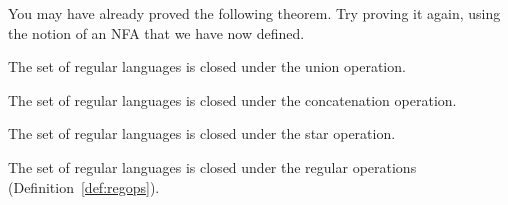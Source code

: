 \documentclass[twoside,letterpaper,openany]{book}
\begin{document}
\begin{discussion}
You may have already proved the following theorem. Try proving it again, using the notion of an NFA that we have now defined. 
\end{discussion}

\begin{thm}
The set of regular languages is closed under the union operation.
\end{thm}

\begin{thm}
The set of regular languages is closed under the concatenation operation.
\end{thm}

\begin{thm}
The set of regular languages is closed under the star operation.
\end{thm}

\begin{corol}
The set of regular languages is closed under the regular operations (Definition~\ref{def:regops}).
\end{corol}

\newcommand\charA{{\texttt{a}}}
\newcommand\charB{{\texttt{b}}}
\end{document}

